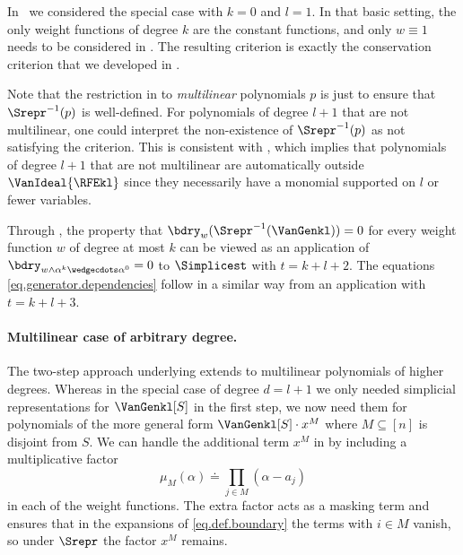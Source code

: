 \documentclass{toc}
\begin{document}
In~ we considered the special case with $k=0$ and $l=1$. In that basic setting, the only weight functions of degree $k$ are the constant functions, and only $w \equiv 1$ needs to be considered in . The resulting criterion is exactly the conservation criterion that we developed in .

Note that the restriction in  to \emph{multilinear} polynomials $p$ is just to ensure that $\Srepr^{-1}(p)$ is well-defined. For polynomials of degree $l+1$ that are not multilinear, one could interpret the non-existence of $\Srepr^{-1}(p)$ as not satisfying the criterion. This is consistent with , which implies that polynomials of degree $l+1$ that are not multilinear are automatically outside \(\VanIdeal{\RFEkl}\) since they necessarily have a monomial supported on $l$ or fewer variables.

Through , the property that $\bdry_w(\Srepr^{-1}(\VanGenkl)) = 0$ for every weight function $w$ of degree at most $k$ can be viewed as an application of $\bdry_{w \wedge \alpha^k \wedgecdots \alpha^0} = 0$ to $\Simplicest$ with $t = k+l+2$. The equations \eqref{eq.generator.dependencies} follow in a similar way from an application with $t = k+l+3$.

\paragraph{Multilinear case of arbitrary degree.}
The two-step approach underlying  extends to multilinear polynomials of higher degrees. Whereas in the special case of degree $d=l+1$ we only needed simplicial representations for $\VanGenkl[S]$ in the first step, we now need them for polynomials of the more general form $\VanGenkl[S]\cdot x^M$ where $M \subseteq [n]$ is disjoint from $S$. We can handle the additional term $x^M$ in  by including a multiplicative factor 
\begin{equation}\label{eq.mu}
\mu_M(\alpha) \doteq \prod_{j \in M}(\alpha - a_j)
\end{equation}
in each of the weight functions. The extra factor acts as a masking term and ensures that in the expansions of \eqref{eq.def.boundary} the terms with $i \in M$ vanish, so under $\Srepr$ the factor $x^M$ remains. 
\end{document}
